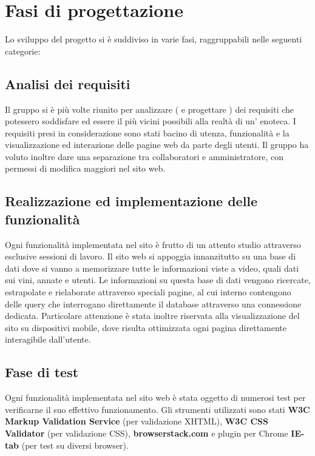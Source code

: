 \section{Fasi di progettazione}

Lo sviluppo del progetto si è suddiviso in varie fasi, raggruppabili nelle seguenti categorie:

\subsection{Analisi dei requisiti}

Il gruppo si è più volte riunito per analizzare ( e progettare ) dei requisiti che potessero soddisfare ed essere il più vicini possibili alla realtà di un' enoteca. 
I requisiti presi in considerazione sono stati bacino di utenza, funzionalità
e la visualizzazione ed interazione delle pagine web da parte degli utenti. 
Il gruppo ha voluto inoltre dare una separazione tra collaboratori e amministratore, con permessi di modifica maggiori nel sito web. 

\subsection{Realizzazione ed implementazione delle funzionalità}

Ogni funzionalità implementata nel sito è frutto di un attento studio attraverso esclusive sessioni di lavoro.
Il sito web si appoggia innanzitutto su una base di dati dove si vanno a memorizzare tutte le informazioni viste a video, quali dati sui vini, annate e utenti. 
Le informazioni su questa base di dati vengono ricercate, estrapolate e rielaborate attraverso speciali pagine, al cui interno contengono delle
query che interrogano direttamente il database attraverso una connessione dedicata.
Particolare attenzione è stata inoltre riservata alla visualizzazione del sito su dispositivi mobile, dove risulta ottimizzata ogni pagina direttamente interagibile dall'utente.

\subsection{Fase di test}

Ogni funzionalità implementata nel sito web è stata oggetto di numerosi test per verificarne il suo effettivo funzionamento. Gli strumenti utilizzati sono stati \textbf{W3C Markup Validation Service} (per validazione XHTML), \textbf{W3C CSS Validator} (per validazione CSS), \textbf{browserstack.com} e plugin per Chrome \textbf{IE-tab} (per test su diversi browser).

